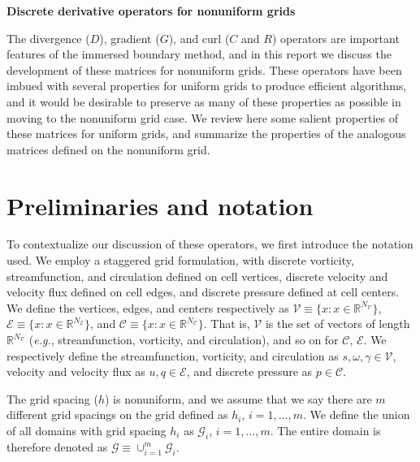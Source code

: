 \documentclass[11pt]{article}
\begin{document}
\LARGE{
\begin{center}
\textbf{Discrete derivative operators for nonuniform grids}
\end{center}
}
\normalsize

The divergence ($D$), gradient ($G$), and curl ($C$ and $R$) operators are important features of the immersed boundary method, and in this report we discuss the development of these matrices for nonuniform grids. These operators have been imbued with several properties for uniform grids to produce efficient algorithms, and it would be desirable to preserve as many of these properties as possible in moving to the nonuniform grid case. We review here some salient properties of these matrices for uniform grids, and summarize the properties of the analogous matrices defined on the nonuniform grid.

\section{Preliminaries and notation}

To contextualize our discussion of these operators, we first introduce the notation used. We employ a staggered grid formulation, with discrete vorticity, streamfunction, and circulation defined on cell vertices, discrete velocity and velocity flux defined on cell edges, and discrete pressure defined at cell centers. We define the vertices, edges, and centers respectively as $\mathcal{V} \equiv \{ x : x\in \mathbb{R}^{N_\mathcal{V}}\}$, $\mathcal{E} \equiv\{ x : x \in \mathbb{R}^{N_\mathcal{E}} \}$, and $\mathcal{C} \equiv \{ x : x \in \mathbb{R}^{N_\mathcal{C}} \}$. That is, $\mathcal{V}$ is the set of vectors of length $\mathbb{R}^{N_\mathcal{V}}$ (\emph{e.g.}, streamfunction, vorticity, and circulation), and so on for $\mathcal{C}$, $\mathcal{E}$. We respectively define the streamfunction, vorticity, and circulation as $s, \omega, \gamma \in \mathcal{V}$,  velocity and velocity flux as $u,q \in \mathcal{E}$, and discrete pressure as $p\in\mathcal{C}$.

The grid spacing ($h$) is nonuniform, and we assume that we say there are $m$ different grid spacings on the grid defined as $h_i$, $i = 1, \dots, m$. We define the union of all domains with grid spacing $h_i$ as $\mathcal{G}_i$, $i = 1, \dots, m$. The entire domain is therefore denoted as $\mathcal{G} \equiv \cup_{i = 1}^{m} \mathcal{G}_i$. 
\end{document}
